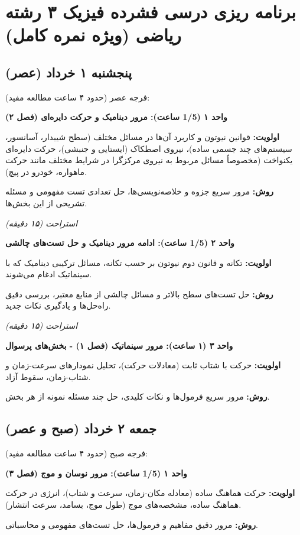 \documentclass[12pt]{article}
\newcommand{\unithead}[1]{\par\vspace{1ex}\noindent\textbf{#1}\par\nopagebreak[4]\vspace{0.5ex}}
\newcommand{\休息}[1]{\par\centering\textit{#1}\par\vspace{1ex}} %
\begin{document}
\section*{برنامه ریزی درسی فشرده فیزیک ۳ رشته ریاضی (ویژه نمره کامل)}


\subsection*{پنجشنبه ۱ خرداد (عصر)}
فرجه عصر (حدود ۴ ساعت مطالعه مفید):

\unithead{واحد ۱ (1/5 ساعت): مرور دینامیک و حرکت دایره‌ای (فصل ۲)}
\noindent\textbf{اولویت: }قوانین نیوتون و کاربرد آن‌ها در مسائل مختلف (سطح شیبدار، آسانسور، سیستم‌های چند جسمی ساده)، نیروی اصطکاک (ایستایی و جنبشی)، حرکت دایره‌ای یکنواخت (مخصوصاً مسائل مربوط به نیروی مرکزگرا در شرایط مختلف مانند حرکت ماهواره، خودرو در پیچ).
\par\noindent\textbf{روش: }مرور سریع جزوه و خلاصه‌نویسی‌ها، حل تعدادی تست مفهومی و مسئله تشریحی از این بخش‌ها.

\休息{استراحت (۱۵ دقیقه)}

\unithead{واحد ۲ (1/5 ساعت): ادامه مرور دینامیک و حل تست‌های چالشی}
\noindent\textbf{اولویت: }تکانه و قانون دوم نیوتون بر حسب تکانه، مسائل ترکیبی دینامیک که با سینماتیک ادغام می‌شوند.
\par\noindent\textbf{روش: }حل تست‌های سطح بالاتر و مسائل چالشی از منابع معتبر، بررسی دقیق راه‌حل‌ها و یادگیری نکات جدید.

\休息{استراحت (۱۵ دقیقه)}

\unithead{واحد ۳ (۱ ساعت): مرور سینماتیک (فصل ۱) - بخش‌های پرسوال}
\noindent\textbf{اولویت: }حرکت با شتاب ثابت (معادلات حرکت)، تحلیل نمودارهای سرعت-زمان و شتاب-زمان، سقوط آزاد.
\par\noindent\textbf{روش: }مرور سریع فرمول‌ها و نکات کلیدی، حل چند مسئله نمونه از هر بخش.

\subsection*{جمعه ۲ خرداد (صبح و عصر)}
فرجه صبح (حدود ۴ ساعت مطالعه مفید):

\unithead{واحد ۱ (1/5 ساعت): مرور نوسان و موج (فصل ۳)}
\noindent\textbf{اولویت: }حرکت هماهنگ ساده (معادله مکان-زمان، سرعت و شتاب)، انرژی در حرکت هماهنگ ساده، مشخصه‌های موج (طول موج، بسامد، سرعت انتشار).
\par\noindent\textbf{روش: }مرور دقیق مفاهیم و فرمول‌ها، حل تست‌های مفهومی و محاسباتی.
\end{document}
